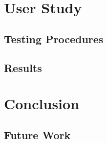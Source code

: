 \chapter{User Study}

\section{Testing Procedures}

\section{Results}

\chapter{Conclusion}

\section{Future Work}
